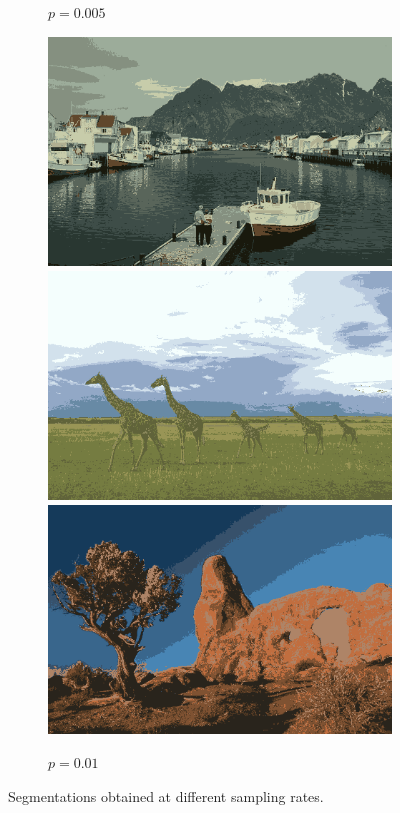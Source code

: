 \documentclass[11pt,a4paper]{article}
\begin{document}
\begin{figure}
\begin{subfigure}[b]{0.24\textwidth}
        \caption{$p=0.005$}
    \end{subfigure}
    \begin{subfigure}[b]{0.24\textwidth}
        \centering
        \includegraphics[width=\textwidth]{figures/sampling_rate/0.01/219090_avg.png}
        \includegraphics[width=\textwidth]{figures/sampling_rate/0.01/253055_avg.png}
        \includegraphics[width=\textwidth]{figures/sampling_rate/0.01/295087_avg.png}
        \caption{$p=0.01$}
    \end{subfigure}
       \caption{Segmentations obtained at different sampling rates.}
       \label{fig:sampling-rate}
\end{figure}
\end{document}
